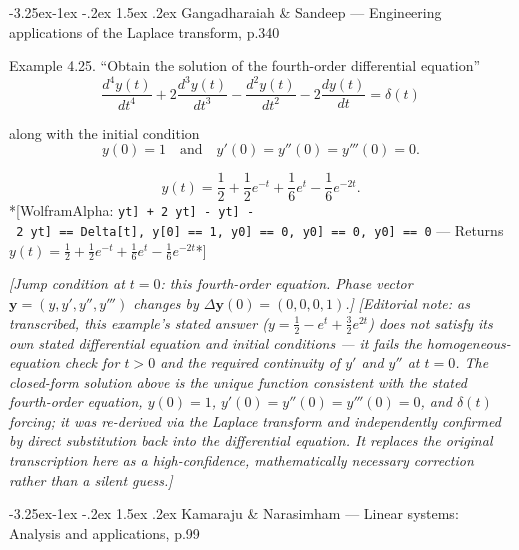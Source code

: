 \documentclass[
  11pt,
]{article}
\makeatletter
\renewcommand\paragraph{\@startsection{paragraph}{4}{\z@}%
                                     {-3.25ex\@plus -1ex \@minus -.2ex}%
                                     {1.5ex \@plus .2ex}%
                                     {\normalfont\normalsize\bfseries}}
\makeatother
\begin{document}
\hypertarget{gangadharaiah-sandeep-engineering-applications-of-the-laplace-transform-p.340}{%
\paragraph{Gangadharaiah \& Sandeep --- Engineering applications of the
Laplace transform,
p.340}\label{gangadharaiah-sandeep-engineering-applications-of-the-laplace-transform-p.340}}

Example 4.25. ``Obtain the solution of the fourth-order differential
equation'' \[
\frac{d^4 y(t)}{dt^4} + 2 \frac{d^3 y(t)}{dt^3} - \frac{d^2 y(t)}{dt^2} - 2 \frac{dy(t)}{dt} = \delta(t)
\]

along with the initial condition \[
y(0) = 1 \quad \text{and} \quad y'(0) = y''(0) = y'''(0) = 0.
\]

\[
y(t) = \frac{1}{2} + \frac{1}{2}e^{-t} + \frac{1}{6}e^{t} - \frac{1}{6}e^{-2t}.
\] *{[}WolframAlpha:
\texttt{y\textquotesingle{}\textquotesingle{}\textquotesingle{}\textquotesingle{}{[}t{]}\ +\ 2\ y\textquotesingle{}\textquotesingle{}\textquotesingle{}{[}t{]}\ -\ y\textquotesingle{}\textquotesingle{}{[}t{]}\ -\ 2\ y\textquotesingle{}{[}t{]}\ ==\ Delta{[}t{]},\ y{[}0{]}\ ==\ 1,\ y\textquotesingle{}{[}0{]}\ ==\ 0,\ y\textquotesingle{}\textquotesingle{}{[}0{]}\ ==\ 0,\ y\textquotesingle{}\textquotesingle{}\textquotesingle{}{[}0{]}\ ==\ 0}
--- Returns
\(y(t) = \frac{1}{2} + \frac{1}{2} e^{-t} + \frac{1}{6} e^{t} - \frac{1}{6} e^{-2t}\)*{]}

\emph{{[}Jump condition at \(t=0\): this fourth-order equation. Phase
vector \(\mathbf y=(y,y',y'',y''')\) changes by
\(\Delta\mathbf y(0)=(0,0,0,1)\).{]}} \emph{{[}Editorial note: as
transcribed, this example's stated answer
(\(y = \frac{1}{2} - e^t + \frac{3}{2}e^{2t}\)) does not satisfy its own
stated differential equation and initial conditions --- it fails the
homogeneous-equation check for \(t>0\) and the required continuity of
\(y'\) and \(y''\) at \(t=0\). The closed-form solution above is the
unique function consistent with the stated fourth-order equation,
\(y(0)=1\), \(y'(0)=y''(0)=y'''(0)=0\), and \(\delta(t)\) forcing; it
was re-derived via the Laplace transform and independently confirmed by
direct substitution back into the differential equation. It replaces the
original transcription here as a high-confidence, mathematically
necessary correction rather than a silent guess.{]}}

\hypertarget{kamaraju-narasimham-linear-systems-analysis-and-applications-p.99}{%
\paragraph{Kamaraju \& Narasimham --- Linear systems: Analysis and
applications,
p.99}\label{kamaraju-narasimham-linear-systems-analysis-and-applications-p.99}}
\end{document}
